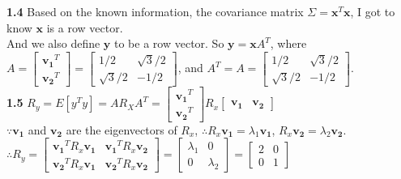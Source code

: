 \documentclass[a4paper]{article}
\begin{document}
\begin{spacing}{2.0}
	\noindent	
	\textbf{1.4} 
	Based on the known information, the covariance matrix $\Sigma = \mathbf{x}^T\mathbf{x}$, I got to know $\mathbf{x}$ is a row vector.\\
	And we also define $\mathbf{y}$ to be a row vector. So
	$\mathbf{y} = \mathbf{x}A^T$, where $A = \left[ \begin{matrix} \mathbf{v_1}^T \\ \mathbf{v_2}^T \end{matrix} \right] = \left[ \begin{matrix} 1/2 & 			\sqrt{3}/2 \\ \sqrt{3}/2 & -1/2 \end{matrix}\right]$, and $A^T = A = \left[ \begin{matrix} 1/2 & \sqrt{3}/2 \\ \sqrt{3}/2 & -1/2 \end{matrix}\right]$. \\
	
	\noindent	
	\textbf{1.5} 
	$R_y = E[y^Ty] = AR_XA^T =  \left[ \begin{matrix} \mathbf{v_1}^T \\ \mathbf{v_2}^T \end{matrix} \right] R_x \left[ \begin{matrix} \mathbf{v_1} & 			\mathbf{v_2} \end{matrix} \right]$\\
	$\because \mathbf{v_1}$ and $\mathbf{v_2}$ are the eigenvectors of $R_x$, $\therefore R_x\mathbf{v_1} = \lambda_1\mathbf{v_1}$, 				$R_x\mathbf{v_2} = \lambda_2\mathbf{v_2}$. \\
	$\therefore R_y = \left[ \begin{matrix} \mathbf{v_1}^TR_x\mathbf{v_1} & \mathbf{v_1}^TR_x\mathbf{v_2} \\ \mathbf{v_2}^TR_x\mathbf{v_1} & 			\mathbf{v_2}^TR_x\mathbf{v_2}\end{matrix}\right] = \left[ \begin{matrix} \lambda_1 & 0 \\ 0 & \lambda_2 \end{matrix}\right] = \left[ \begin{matrix} 2 & 0 	\\ 0 &1\end{matrix}\right]$\\	
	

\end{spacing}
\end{document}
